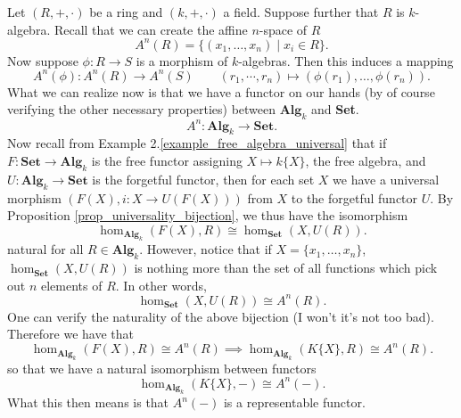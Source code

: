     \begin{example}\label{example_affine_representable}
        Let $(R, +, \cdot)$ be a ring and $(k, +, \cdot)$ a field.
        Suppose further that $R$ is $k$-algebra. 
        Recall that we can create the affine $n$-space of $R$ 
        \[
            A^n(R) = \{(x_1, \dots, x_n) \mid x_i \in R\}.
        \]
        Now suppose $\phi: R \to S$ is a morphism of $k$-algebras. Then 
        this induces a mapping 
        \[
            A^n(\phi):  A^n(R) \to A^n(S) \qquad (r_1, \cdots, r_n) \mapsto (\phi(r_1), \dots, \phi(r_n)).
        \]
        What we can realize now is that we have a functor on our hands (by of 
        course verifying the other necessary properties) between 
        $\textbf{Alg}_k$ and \textbf{Set}. 
        \[
            A^n: \textbf{Alg}_{k} \to \textbf{Set}.          
        \]
        Now recall from Example 2.\ref{example_free_algebra_universal}
        that if $F: \textbf{Set} \to \textbf{Alg}_k$ is the free functor 
        assigning $X \mapsto k\{X\}$, the free algebra,
        and $U: \textbf{Alg}_k \to \textbf{Set}$ is the forgetful functor,
        then for each set $X$ we have a universal morphism 
        $(F(X), i: X \to U(F(X)))$ from $X$ to the forgetful functor $U$. 
        By Proposition \ref{prop_universality_bijection}, we thus have the 
        isomorphism
        \[
            \hom_{\textbf{Alg}_k}(F(X), R) 
            \cong 
            \hom_{\textbf{Set}}(X, U(R)).
        \] 
        natural for all $R \in \textbf{Alg}_k$. 
        However, notice that if $X = \{x_1, \dots, x_n\}$, $\hom_{\textbf{Set}}(X, U(R))$ is nothing 
        more than the set of all functions which pick out $n$ elements of 
        $R$. In other words, 
        \[
            \hom_{\textbf{Set}}(X, U(R)) \cong A^n(R).    
        \]
        One can verify the naturality of the above bijection (I won't it's not too bad).
        Therefore we have that 
        \[
            \hom_{\textbf{Alg}_k}(F(X), R) \cong A^n(R)
            \implies 
            \hom_{\textbf{Alg}_k}(K\{X\}, R) \cong A^n(R).   
        \]
        so that we have a natural isomorphism between functors 
        \[
            \hom_{\textbf{Alg}_k}(K\{X\}, -) \cong A^n(-).
        \]
        What this then means is that $A^n(-)$ is a representable functor.         
    \end{example}

